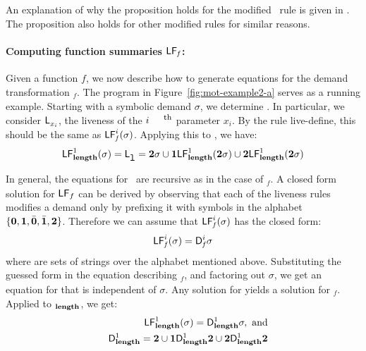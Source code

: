 \documentclass[9pt,preprint,nonatbib]{sigplanconf}
\begin{document}
An  explanation of  why the  proposition holds  for the
modified  \CONS\ rule  is  given in  \cite{asati14lgc}.
The proposition also holds for other modified rules for
similar reasons.



\paragraph{Computing function summaries $\mathsf{LF}_{\mathit f}$:}
Given a  function $\mathit{f}$, we now  describe how to
generate  equations   for  the   demand  transformation
\Lfonly$_\mathit{f}$.        The       program       in
Figure~\ref{fig:mot-example2-a}   serves  as   a  running
example.  Starting with a  symbolic demand $\sigma$, we
determine  .   In
particular, we  consider $\mathsf{L}_{{x_i}}^{}$,  the liveness
of the $i^{\mbox{\footnotesize th}}$ parameter $x_i$.   By   the   rule   {\sc
  live-define},   this   should    be   the   same   as
$\mathsf{LF}_{\mathit f}^{i}( {\mathit \sigma})$. Applying this to \length, we have:
$$
 \mathsf{LF}_{\mathit {\mathbf{length}}}^{1}( {\mathit \sigma}) = \mathsf{L}_{{\mbox{\tt l}}}^{} = {\mathbf{2}}\sigma \cup \mathbf{1}\mathsf{LF}_{\mathit {\mathbf{length}}}^{1}( {\mathit {{\mathbf{2}}}\sigma})
  \cup {\mathbf{2}}\mathsf{LF}_{\mathit {\mathbf{length}}}^{1}( {\mathit {{\mathbf{2}}}\sigma})
$$

In general, the equations for \Lfonly\ are recursive as in the case of
\Lfonly$_\mathit{f}$. A closed  form solution for $\mathsf{LF}_{\mathit \mathit{f}}$
can be derived by observing that each of the liveness rules modifies a
demand  only by  prefixing it  with symbols  in the  alphabet $\lbrace
\mathbf{0}, \mathbf{1},\bar{\mathbf{0}},  \bar{\mathbf{1}}, {\mathbf{2}}  \rbrace$. Therefore we  can assume
that $\mathsf{LF}_{\mathit f}^{i}( {\mathit \sigma})$ has the closed form:
\begin{eqnarray}
\label{eq:LF:DI}
  \mathsf{LF}_{\mathit f}^{i}( {\mathit \sigma}) = \mathsf{D}_{\mathit f}^{i}\sigma
\end{eqnarray}
where   are sets of strings  over the alphabet
mentioned above.  Substituting the  guessed form in the
equation   describing    \Lfonly$_{\mathit   f}$,   and
factoring  out   $\sigma$,  we  get  an   equation  for
  that   is  independent  of   $\sigma$.   Any
solution   for      yields  a   solution   for
\Lfonly$_{\mathit  f}$.   Applied to  \Lfonly$_{\mathit
  {\mathbf{length}}}$, we get:
  \begin{eqnarray*}
&&  \mathsf{LF}_{\mathit {\mathbf{length}} }^{1}( {\mathit \sigma}) = \mathsf{D}_{\mathit {\mathbf{length}}}^{1}\sigma,~\mbox{and}\\
&&   \mathsf{D}_{\mathit {\mathbf{length}}}^{1} = {\mathbf{2}} \cup \mathbf{1}\mathsf{D}_{\mathit {\mathbf{length}}}^{1}{\mathbf{2}}
       \cup {\mathbf{2}}\mathsf{D}_{\mathit {\mathbf{length}}}^{1}{{\mathbf{2}}}
  \end{eqnarray*}
\end{document}
